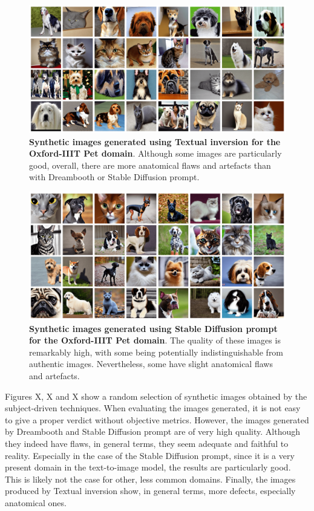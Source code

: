 \begin{figure}
    \centering
    \includegraphics[width=1\textwidth]{Pictures/textual-inversion-img.png} 
    \caption{\textbf{Synthetic images generated using Textual inversion for the Oxford-IIIT Pet domain}. Although some images are particularly good, overall, there are more anatomical flaws and artefacts than with Dreambooth or Stable Diffusion prompt.}
    \label{fig:exp3-images-text}
\end{figure}

\begin{figure}
    \centering
    \includegraphics[width=1\textwidth]{Pictures/stable_diffusion_prompt-img.png} 
    \caption{\textbf{Synthetic images generated using Stable Diffusion prompt for the Oxford-IIIT Pet domain}. The quality of these images is remarkably high, with some being potentially indistinguishable from authentic images. Nevertheless, some have slight anatomical flaws and artefacts.}
    \label{fig:exp3-images-sd}
\end{figure}

Figures X, X and X show a random selection of synthetic images obtained by the subject-driven techniques. When evaluating the images generated, it is not easy to give a proper verdict without objective metrics. However, the images generated by Dreambooth and Stable Diffusion prompt are of very high quality. Although they indeed have flaws, in general terms, they seem adequate and faithful to reality. Especially in the case of the Stable Diffusion prompt, since it is a very present domain in the text-to-image model, the results are particularly good. This is likely not the case for other, less common domains. Finally, the images produced by Textual inversion show, in general terms, more defects, especially anatomical ones.

